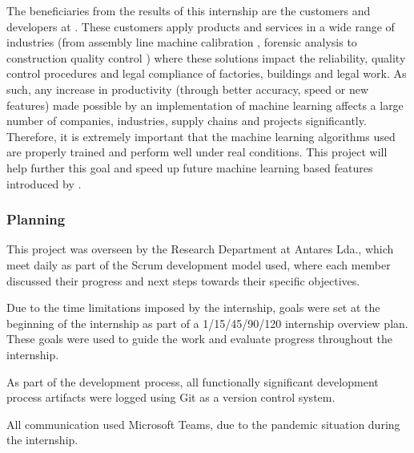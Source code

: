 The beneficiaries from the results of this internship are the customers and developers at \faro. These customers apply \faro products and services in a wide range of industries (from assembly line machine calibration \parencite{faro_man_eq_align}, forensic analysis \parencite{faro_forensic} to construction quality control \parencite{faro_construction}) where these solutions impact the reliability, quality control procedures and legal compliance of factories, buildings and legal work. As such, any increase in productivity (through better accuracy, speed or new features) made possible by an implementation of machine learning affects a large number of companies, industries, supply chains and projects significantly. Therefore, it is extremely important that the machine learning algorithms used are properly trained and perform well under real conditions. This project will help further this goal and speed up future machine learning based features introduced by \faro.

\subsubsection{Planning}

This project was overseen by the Research Department at Antares Lda., which meet daily as part of the Scrum development model used, where each member discussed their progress and next steps towards their specific objectives. 

Due to the time limitations imposed by the internship, goals were set at the beginning of the internship as part of a 1/15/45/90/120 internship overview plan. These goals were used to guide the work and evaluate progress throughout the internship.

As part of the development process, all functionally significant development process artifacts were logged using Git as a version control system.

All communication used Microsoft Teams, due to the pandemic situation during the internship.